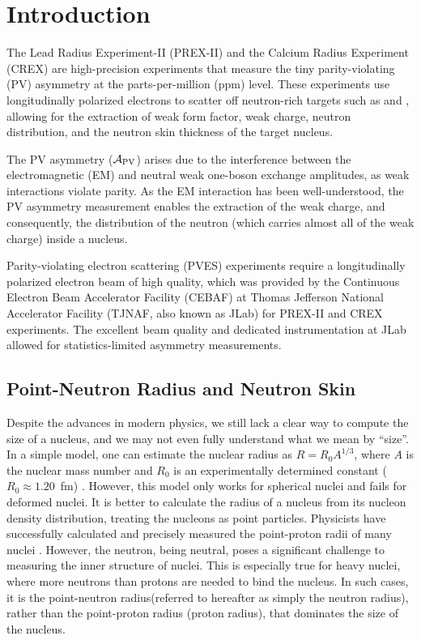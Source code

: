 \chapter{Introduction}
The Lead Radius Experiment-II (PREX-II) and the Calcium Radius Experiment (CREX) are high-precision experiments that measure the tiny parity-violating (PV) asymmetry at the parts-per-million (ppm) level. These experiments use longitudinally polarized electrons to scatter off neutron-rich targets such as \Pb and \Ca, allowing for the extraction of weak form factor, weak charge, neutron distribution, and the neutron skin thickness of the target nucleus.

The PV asymmetry ($\mathcal{A}_{\text{PV}}$) arises due to the interference between the electromagnetic (EM) and neutral weak one-boson exchange amplitudes, as weak interactions violate parity. As the EM interaction has been well-understood, the PV asymmetry measurement enables the extraction of the weak charge, and consequently, the distribution of the neutron (which carries almost all of the weak charge) inside a nucleus.

Parity-violating electron scattering (PVES) experiments require a longitudinally polarized electron beam of high quality, which was provided by the Continuous Electron Beam Accelerator Facility (CEBAF) at Thomas Jefferson National Accelerator Facility (TJNAF, also known as JLab) for PREX-II and CREX experiments. The excellent beam quality and dedicated instrumentation at JLab allowed for statistics-limited asymmetry measurements.

\section{Point-Neutron Radius and Neutron Skin}
Despite the advances in modern physics, we still lack a clear way to compute the size of a nucleus, and we may not even fully understand what we mean by ``size''. In a simple model, one can estimate the nuclear radius as $R = R_0 A^{1/3}$, where $A$ is the nuclear mass number and $R_0$ is an experimentally determined constant ($R_0 \approx 1.20$~fm) \cite{ROYER2008105}. However, this model only works for spherical nuclei and fails for deformed nuclei. It is better to calculate the radius of a nucleus from its nucleon density distribution, treating the nucleons as point particles. Physicists have successfully calculated and precisely measured the point-proton radii of many nuclei \cite{DEVRIES1987495, ANGELI201369}. However, the neutron, being neutral, poses a significant challenge to measuring the inner structure of nuclei. This is especially true for heavy nuclei, where more neutrons than protons are needed to bind the nucleus. In such cases, it is the point-neutron radius(referred to hereafter as simply the neutron radius), rather than the point-proton radius (proton radius), that dominates the size of the nucleus.

